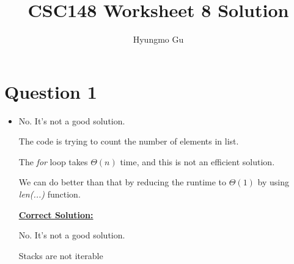 \documentclass[12pt]{article}
\begin{document}
\title{CSC148 Worksheet 8 Solution}
\author{Hyungmo Gu}
\maketitle

\section*{Question 1}
\begin{itemize}
    \item
    No. It's not a good solution.

    \bigskip

    The code is trying to count the number of elements in list.

    \bigskip

    The \textit{for} loop takes $\Theta(n)$ time, and this is not an efficient solution.

    \bigskip

    We can do better than that by reducing the runtime to $\Theta(1)$ by using \textit{len(...)} function.

    \bigskip

    \begin{mdframed}
        \underline{\textbf{Correct Solution:}}

        \bigskip
        \color{red}
        No. It's not a good solution.

        \bigskip

        Stacks are not iterable
        \color{black}
    \end{mdframed}

\end{itemize}
\end{document}
